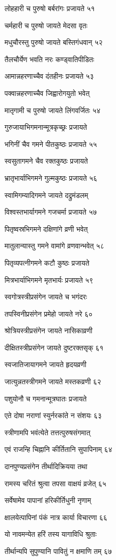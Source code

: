 लोहहारी च पुरुषो बर्बरांगः प्रजायते ५१

चर्महारी च पुरुषो जायते मेदसा वृतः

मधुचौरस्तु पुरुषो जायते बस्तिगंधवान् ५२

तैलचौर्येण भवति नरः कण्ड्वातिपीडितः

आमान्नहरणाच्चैव दंतहीनः प्रजायते ५३

पक्वान्नहरणाच्चैव जिह्वारोगयुतो भवेत्

मातृगामी च पुरुषो जायते लिंगवर्जितः ५४

गुरुजायाभिगमनान्मूत्रकृच्छ्रः प्रजायते

भगिनीं चैव गमने पीतकुष्ठः प्रजायते ५५

स्वसुतागमने चैव रक्तकुष्ठः प्रजायते

भ्रातृभार्याभिगमने गुल्मकुष्ठः प्रजायते ५६

स्वामिगम्यादिगमने जायते दद्रुमंडलम्

विश्वस्तभार्यागमने गजचर्मा प्रजायते ५७

पितृष्वस्रभिगमने दक्षिणांगे व्रणी भवेत्

मातुलान्यास्तु गमने वामांगे व्रणवान्भवेत् ५८

पितृव्यपत्नीगमने कटौ कुष्ठः प्रजायते

मित्रभार्याभिगमने मृतभार्यः प्रजायते ५९

स्वगोत्रस्त्रीप्रसंगेन जायते च भगंदरः

तपस्विनीप्रसंगेन प्रमेहो जायते नरे ६०

श्रोत्रियस्त्रीप्रसंगेन जायते नासिकाव्रणी

दीक्षितस्त्रीप्रसंगेन जायते दुष्टरक्तसृक् ६१

स्वजातिजायागमने जायते हृदयव्रणी

जात्युन्नतस्त्रीगमने जायते मस्तकव्रणी ६२

पशुयोनौ च गमनान्मूत्रघातः प्रजायते

एते दोषा नराणां स्युर्नरकांते न संशयः ६३

स्त्रीणामपि भवंत्येते तत्तत्पुरुषसंगमात्

एवं राजन्हि चिह्नानि कीर्तितानि सुपापिनाम् ६४

दानपुण्यप्रसंगेन तीर्थादिक्रियया तथा

रामस्य चरितं श्रुत्वा तपसा वाक्षयं व्रजेत् ६५

सर्वेषामेव पापानां हरिकीर्तिधुनी नृणाम्

क्षालयेत्पापिनां पंकं नात्र कार्या विचारणा ६६

यो नावमन्येत हरिं तस्य यागाविधि श्रुताः

तीर्थान्यपि सुपुण्यानि पावितुं न क्षमाणि तम् ६७

